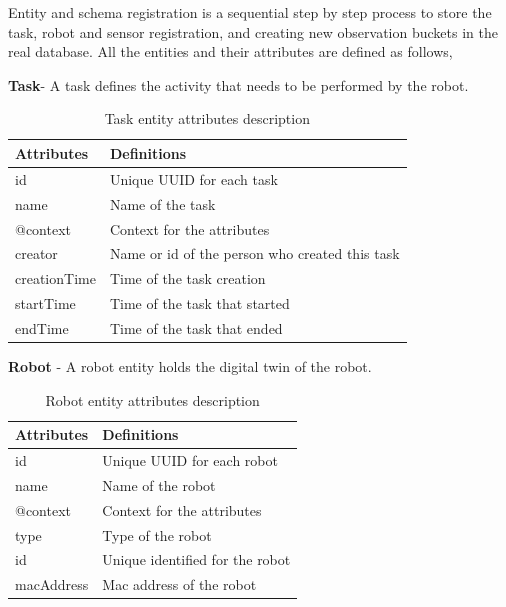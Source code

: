 	Entity and schema registration is a sequential step by step process to store the task, robot and sensor registration, and creating new observation buckets in the real database. All the entities and their attributes are defined as follows,
	
	\textbf{Task}- A task defines the activity that needs to be performed by the robot.
	
	\begin{table}[!htbp]
		\begin{tabular}{|l|p{8cm}|}
			\hline
			\textbf{Attributes} & \textbf{Definitions} \\ \hline
			id & Unique UUID for each task \\ \hline
			name &  Name of the task \\ \hline
			@context &  Context for the attributes\\ \hline
			creator &  Name or id of the person who created this task\\ \hline
			creationTime &  Time of the task creation\\ \hline
			startTime & Time of the task that started\\ \hline
			endTime &  Time of the task that ended\\ \hline
			
		\end{tabular}
		\caption{Task entity attributes description}
		\label{tab:task_entity}
	\end{table}

	\textbf{Robot} - A robot entity holds the digital twin of the robot.
	
	\begin{table}[!htbp]
		\begin{tabular}{|l|p{8cm}|}
			\hline
			\textbf{Attributes} & \textbf{Definitions} \\ \hline
			id & Unique UUID for each robot \\ \hline
			name & Name of the robot \\ \hline
			@context & Context for the attributes \\ \hline
			type & Type of the robot \\ \hline
			id & Unique identified for the robot \\ \hline
			macAddress & Mac address of the robot \\ \hline
			
		\end{tabular}
		\caption{Robot entity attributes description}
		\label{tab:robot_entity}
	\end{table}

